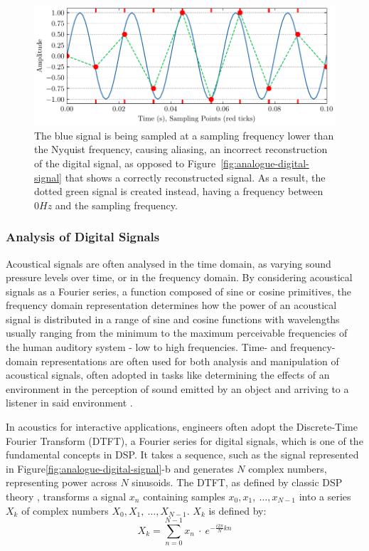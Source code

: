\begin{figure}
    \centering
    \includegraphics[width=1\linewidth]{aliasing}
    \caption{The blue signal is being sampled at a sampling frequency lower than the Nyquist frequency, causing aliasing, an incorrect reconstruction of the digital signal, as opposed to Figure~\ref{fig:analogue-digital-signal} that shows a correctly reconstructed signal. As a result, the dotted green signal is created instead, having a frequency between $0Hz$ and the sampling frequency.}
    \label{fig:aliasing}
\end{figure}

\subsubsection{Analysis of Digital Signals}
Acoustical signals are often analysed in the time domain, as varying sound pressure levels over time, or in the frequency domain. By considering acoustical signals as a Fourier series, a function composed of sine or cosine primitives, the frequency domain representation determines how the power of an acoustical signal is distributed in a range of sine and cosine functions with wavelengths usually ranging from the minimum to the maximum perceivable frequencies of the human auditory system - low to high frequencies. Time- and frequency-domain representations are often used for both analysis and manipulation of acoustical signals, often adopted in tasks like determining the effects of an environment in the perception of sound emitted by an object and arriving to a listener in said environment \cite{ballou2013handbook}. \par 
In acoustics for interactive applications, engineers often adopt the Discrete-Time Fourier Transform (DTFT), a Fourier series for digital signals, which is one of the fundamental concepts in DSP. It takes a sequence, such as the signal represented in Figure\ref{fig:analogue-digital-signal}-b and generates $N$ complex numbers, representing power across $N$ sinusoids. The DTFT, as defined by classic DSP theory \cite{shenoi2005introduction}, transforms a signal $x_n$ containing samples $x_0, x_1,~\dots, x_{N-1}$ into a series $X_k$ of complex numbers $X_0, X_1,~\dots, X_{N-1}$. $X_k$ is defined by:
\begin{equation}
    X_k = \sum_{n=0}^{N-1} x_n~\cdot~e^{-\frac{i2\pi}{N}kn}
\end{equation}

